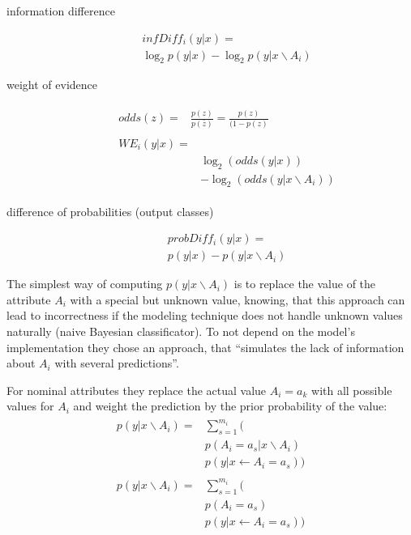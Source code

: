 \begin{description}
    \item[information difference] 
    \begin{multline}
        infDiff_{i}(y|x) = \\
        \log_{2} p(y|x)−\log_{2} p(y|x \backslash A_{i})
    \end{multline}
    \item[weight of evidence] 
    \begin{align}
        \begin{split}
            odds(z) ={}& \frac{p(z)}{p(\bar{z})} = \frac{p(z)}{(1 − p(z)}
        \end{split}\\
        \begin{split}
            WE_{i}(y|x) ={}& \\
            & \log_{2} (odds(y|x)) \\
            & - \log_{2}(odds(y|x \backslash A_{i}))    
        \end{split}
    \end{align}
    \item[difference of probabilities (output classes)]
    \begin{multline}
        probDiff_{i} (y|x) = \\
    p(y|x)− p(y|x \backslash A_{i})
    \end{multline}
\end{description}
The simplest way of computing \(p(y|x \backslash A_{i})\) is to replace the value of the attribute \(A_{i}\) with a special but unknown value, knowing, that this approach can lead to incorrectness if the modeling technique does not handle unknown values naturally (naive Bayesian classificator).
To not depend on the model's implementation they chose an approach, that “simulates the lack of information about \(A_{i}\) with several predictions”\cite[p.4]{RobnikSikonja.2008}.
\par
For  nominal attributes they replace the actual value \(A_{i} = a_{k}\) with all possible values for \(A_{i}\) and weight the prediction by the prior probability of the value: 
\begin{align}
    \begin{split}
        p(y|x \backslash A_{i}) ={}& \sum_{s=1}^{m_{i}} \biggl(\\ 
        & p(A_{i} = a_{s} | x \backslash A_{i}) \\
        & p(y|x \leftarrow A_{i} = a_{s})\biggr)
    \end{split}\\
    \begin{split}
        p(y|x \backslash A_{i}) ={}& \sum_{s=1}^{m_{i}} \biggl(\\
        & p(A_{i} = a_{s}) \\
        & p(y|x \leftarrow A_{i} = a_{s}) \biggr)
    \end{split}
\end{align}

